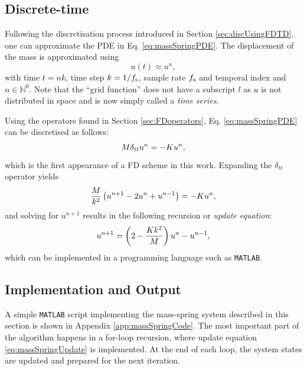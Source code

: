 \subsection{Discrete-time}
Following the discretisation process introduced in Section \ref{sec:discUsingFDTD}, one can approximate the PDE in Eq. \eqref{eq:massSpringPDE}. The displacement of the mass is approximated using 
\begin{equation}
    u(t) \approx u^n,
\end{equation}
with time $t = nk$, time step $k = 1/f_\text{s}$, sample rate $f_\text{s}$ and temporal index and $n \in \mathbb{N}^0$. Note that the ``grid function'' does not have a subscript $l$ as $u$ is not distributed in space and is now simply called a \textit{time series}.

Using the operators found in Section 
\ref{sec:FDoperators}, Eq. \eqref{eq:massSpringPDE} can be discretised as follows:
\begin{equation}\label{eq:massSpringFDS}
    M \delta_{tt} u^n = -Ku^n,
\end{equation}
which is the first appearance of a FD scheme in this work. Expanding the $\delta_{tt}$ operator yields 
\begin{equation*}
    \frac{M}{k^2}\left(u^{n+1}-2u^n+u^{n-1}\right) = -Ku^n,\nonumber
\end{equation*}
and solving for $u^{n+1}$ results in the following recursion or \textit{update equation}:
\begin{equation}\label{eq:massSpringUpdate}
    u^{n+1} = \left(2-\frac{Kk^2}{M} \right)u^n - u^{n-1},
\end{equation}
which can be implemented in a programming language such as \texttt{MATLAB}. 

\subsection{Implementation and Output}\label{sec:massSpringImplementation}
A simple \texttt{MATLAB} script implementing the mass-spring system described in this section is shown in Appendix \ref{app:massSpringCode}. The most important part of the algorithm happens in a for-loop recursion, where update equation \eqref{eq:massSpringUpdate} is implemented. At the end of each loop, the system states are updated and prepared for the next iteration. %

